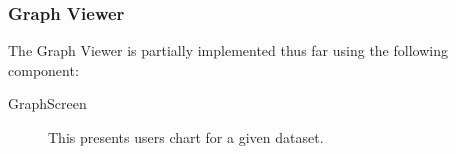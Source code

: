 \subsubsection{Graph Viewer}
The Graph Viewer is partially implemented thus far using the following component:
\begin{description}
\item[GraphScreen] This presents users chart for a given dataset.
\end{description}

